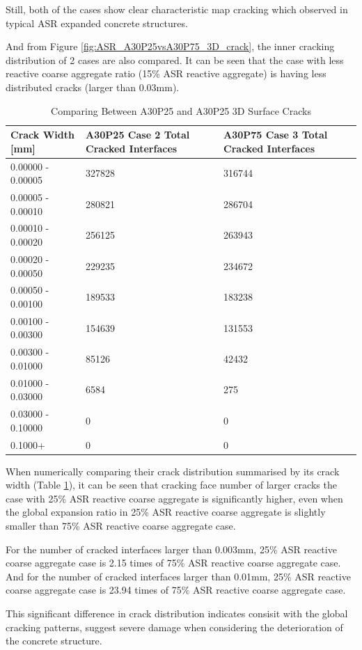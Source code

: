 Still, both of the cases show clear characteristic map cracking which observed in typical ASR expanded concrete structures.

And from Figure \ref{fig:ASR_A30P25vsA30P75_3D_crack}, the inner cracking distribution of 2 cases are also compared. It can be seen that the case with less reactive coarse aggregate ratio (15\% ASR reactive aggregate) is having less distributed cracks (larger than 0.03mm).



\begin{table}[!h]
\centering
\begin{tabular}{ ||p{4cm}|p{4cm}|p{4cm}|| }
\hline
 Crack Width [mm] &  A30P25 Case 2 Total Cracked Interfaces &  A30P75 Case 3 Total Cracked Interfaces \\
 \hline\hline

   0.00000 - 0.00005 & 327828 & 316744 \\
   0.00005 - 0.00010 & 280821 & 286704 \\
   0.00010 - 0.00020 & 256125 & 263943 \\
   0.00020 - 0.00050 & 229235 & 234672 \\
   0.00050 - 0.00100 & 189533 & 183238 \\
   0.00100 - 0.00300 & 154639 & 131553 \\
   0.00300 - 0.01000 & 85126 & 42432 \\
   0.01000 - 0.03000 & 6584 & 275 \\
   0.03000 - 0.10000 & 0 & 0 \\
   0.1000+ & 0 & 0 \\

  \hline
  \end{tabular}
  \caption{Comparing Between A30P25 and A30P25 3D Surface Cracks}
\label{table:A30P25_2_vsA30P75_3_Cracks}
\end{table}

When numerically comparing their crack distribution summarised by its crack width (Table \ref{table:A30P25_2_vsA30P75_3_Cracks}),  it can be seen that cracking face number of larger cracks the case with 25\% ASR reactive coarse aggregate is significantly higher, even when the global expansion ratio in 25\% ASR reactive coarse aggregate is slightly smaller than 75\% ASR reactive coarse aggregate case.

For the number of cracked interfaces larger than 0.003mm, 25\% ASR reactive coarse aggregate case is 2.15 times of 75\% ASR reactive coarse aggregate case. And for the number of cracked interfaces larger than 0.01mm, 25\% ASR reactive coarse aggregate case is 23.94 times of 75\% ASR reactive coarse aggregate case.

This significant difference in crack distribution indicates consisit with the global cracking patterns, suggest severe damage when considering the deterioration of the concrete structure.
